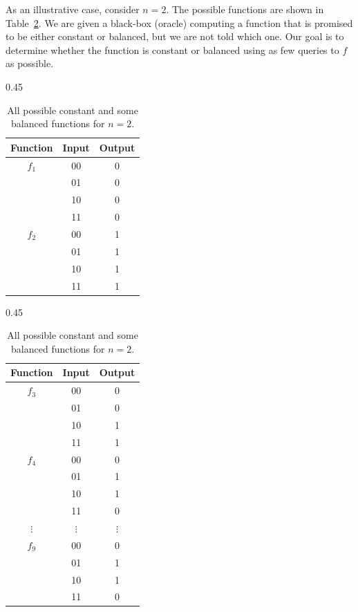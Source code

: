 As an illustrative case, consider \( n = 2 \). The possible functions are shown in Table~\ref{tab:Deutsch-jozsa}. We are given a black-box (oracle) computing a function that is promised to be either constant or balanced, but we are not told which one. Our goal is to determine whether the function is constant or balanced using as few queries to \( f \) as possible.

\begin{table}[ht]
    \centering
    \begin{subtable}[b]{0.45\linewidth}
        \centering
        \begin{tabular}{|c|c|c|}
            \hline
            Function & Input & Output \\
            \hline
            \( f_1 \) & 00 & 0 \\
                     & 01 & 0 \\
                     & 10 & 0 \\
                     & 11 & 0 \\
            \hline
            \( f_2 \) & 00 & 1 \\
                     & 01 & 1 \\
                     & 10 & 1 \\
                     & 11 & 1 \\
            \hline
        \end{tabular}
        \caption{Constant Functions}
    \end{subtable}%
    \hfill
    \begin{subtable}[b]{0.45\linewidth}
        \centering
        \begin{tabular}{|c|c|c|}
            \hline
            Function & Input & Output \\
            \hline
            \( f_3 \) & 00 & 0 \\
                     & 01 & 0 \\
                     & 10 & 1 \\
                     & 11 & 1 \\
            \hline
            \( f_4 \) & 00 & 0 \\
                     & 01 & 1 \\
                     & 10 & 1 \\
                     & 11 & 0 \\
            \hline
            \( \vdots \) & \( \vdots \) & \( \vdots \) \\
            \hline
            \( f_9 \) & 00 & 0 \\
                     & 01 & 1 \\
                     & 10 & 1 \\
                     & 11 & 0 \\
            \hline
        \end{tabular}
        \caption{Balanced Functions}
    \end{subtable}
    \caption{All possible constant and some balanced functions for \( n = 2 \).}
    \label{tab:Deutsch-jozsa}
\end{table}

